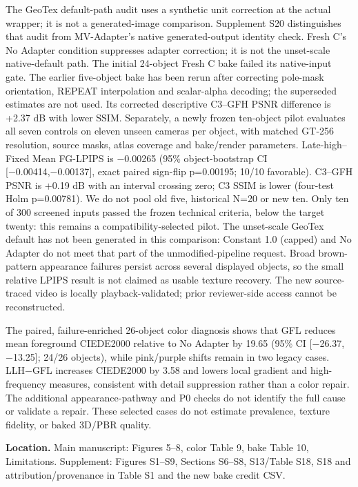 \documentclass[
  10pt,
]{article}
\begin{document}
The GeoTex default-path audit uses a synthetic unit correction at the
actual wrapper; it is not a generated-image comparison. Supplement S20
distinguishes that audit from MV-Adapter's native generated-output
identity check. Fresh C's No Adapter condition suppresses adapter
correction; it is not the unset-scale native-default path. The initial
24-object Fresh C bake failed its native-input gate. The earlier
five-object bake has been rerun after correcting pole-mask orientation,
REPEAT interpolation and scalar-alpha decoding; the superseded estimates
are not used. Its corrected descriptive C3--GFH PSNR difference is +2.37
dB with lower SSIM. Separately, a newly frozen ten-object pilot
evaluates all seven controls on eleven unseen cameras per object, with
matched GT-256 resolution, source masks, atlas coverage and bake/render
parameters. Late-high--Fixed Mean FG-LPIPS is −0.00265 (95\%
object-bootstrap CI {[}−0.00414,−0.00137{]}, exact paired sign-flip
p=0.00195; 10/10 favorable). C3--GFH PSNR is +0.19 dB with an interval
crossing zero; C3 SSIM is lower (four-test Holm p=0.00781). We do not
pool old five, historical N=20 or new ten. Only ten of 300 screened
inputs passed the frozen technical criteria, below the target twenty:
this remains a compatibility-selected pilot. The unset-scale GeoTex
default has not been generated in this comparison: Constant 1.0 (capped)
and No Adapter do not meet that part of the unmodified-pipeline request.
Broad brown-pattern appearance failures persist across several displayed
objects, so the small relative LPIPS result is not claimed as usable
texture recovery. The new source-traced video is locally
playback-validated; prior reviewer-side access cannot be reconstructed.

The paired, failure-enriched 26-object color diagnosis shows that GFL
reduces mean foreground CIEDE2000 relative to No Adapter by 19.65 (95\%
CI {[}−26.37, −13.25{]}; 24/26 objects), while pink/purple shifts remain
in two legacy cases. LLH−GFL increases CIEDE2000 by 3.58 and lowers
local gradient and high-frequency measures, consistent with detail
suppression rather than a color repair. The additional
appearance-pathway and P0 checks do not identify the full cause or
validate a repair. These selected cases do not estimate prevalence,
texture fidelity, or baked 3D/PBR quality.

\textbf{Location.} Main manuscript: Figures 5--8, color Table 9, bake
Table 10, Limitations. Supplement: Figures S1--S9, Sections S6--S8,
S13/Table S18, S18 and attribution/provenance in Table S1 and the new
bake credit CSV.
\end{document}
